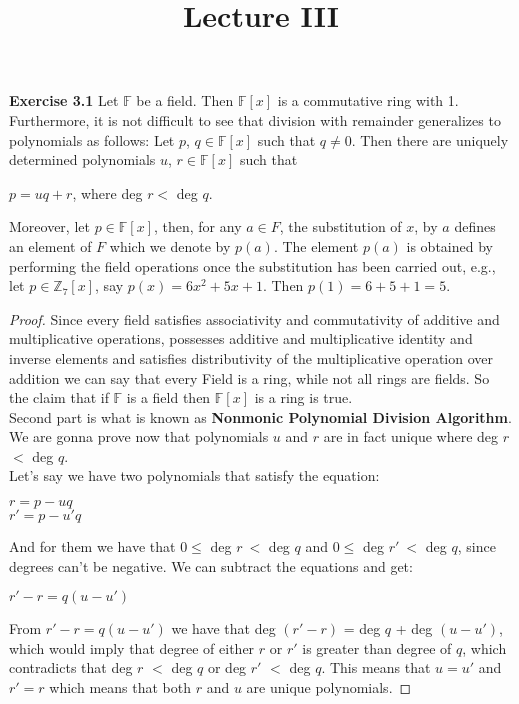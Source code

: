\documentclass{article}
\title{\vspace{-2cm}Lecture III\vspace{-2cm}}
\date{}
\begin{document}
\maketitle
\noindent \textbf{Exercise 3.1} Let $\mathbb{F}$ be a field. Then $\mathbb{F}[x]$ is a commutative ring with 1. Furthermore, it is not difficult to see that division with remainder generalizes to polynomials as follows: Let $p$, $q \in \mathbb{F}[x]$ such that $q \neq0$. Then there are uniquely determined polynomials $u$, $r \in \mathbb{F}[x]$ such that
\begin{center}
$p = uq + r$, where deg $r<$ deg $q$.	
\end{center}
Moreover, let $p \in \mathbb{F}[x]$, then, for any $a \in F$, the substitution of $x$, by $a$ defines an element of $F$ which we denote by $p(a)$. The element $p(a)$ is obtained by performing the field operations once the substitution has been carried out, e.g., let $p \in \mathbb{Z}_{7}[x]$, say $p(x) = 6x^{2} + 5x + 1$. Then $p(1) = 6 + 5 + 1 = 5$.
\begin{proof}
Since every field satisfies associativity and commutativity of additive and multiplicative operations, possesses additive and multiplicative identity and inverse elements and satisfies distributivity of the multiplicative operation over addition we can say that every Field is a ring, while not all rings are fields. So the claim that if $\mathbb{F}$ is a field then $\mathbb{F}[x]$ is a ring is true.\\
Second part is what is known as \textbf{Nonmonic Polynomial Division Algorithm}. We are gonna prove now that polynomials $u$ and $r$ are in fact unique where deg $r$ $<$ deg $q$.\\
Let's say we have two polynomials that satisfy the equation:
\begin{center}
$r = p - uq$\\
$r' = p - u'q$	
\end{center}
And for them we have that $0 \leq $ deg $r\ <$ deg $q$ and $0 \leq $ deg $r'\ <$ deg $q$, since degrees can't be negative. We can subtract the equations and get:
\begin{center}
$r' - r	= q(u - u')$
\end{center}
From $r' - r	= q(u - u')$ we have that deg $(r' - r)$ = deg $q$ + deg $(u - u')$, which would imply that degree of either $r$ or $r'$ is greater than degree of $q$, which contradicts that deg $r$ $<$ deg $q$ or deg $r'$ $<$ deg $q$. This means that $u=u'$ and $r'=r$ which means that both $r$ and $u$ are unique polynomials.

\end{proof}
\end{document}
